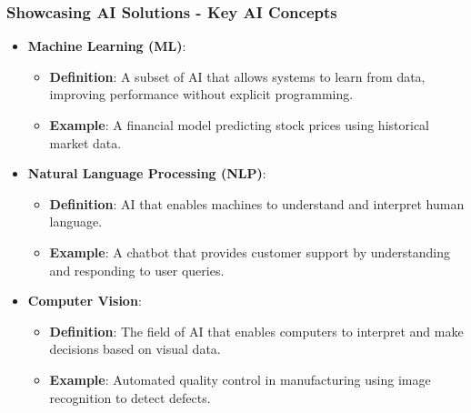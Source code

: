 \documentclass{beamer}
\begin{document}
\begin{frame}[fragile]
    \frametitle{Showcasing AI Solutions - Key AI Concepts}
    \begin{itemize}
        \item \textbf{Machine Learning (ML)}:
        \begin{itemize}
            \item \textbf{Definition}: A subset of AI that allows systems to learn from data, improving performance without explicit programming.
            \item \textbf{Example}: A financial model predicting stock prices using historical market data.
        \end{itemize}
        
        \item \textbf{Natural Language Processing (NLP)}:
        \begin{itemize}
            \item \textbf{Definition}: AI that enables machines to understand and interpret human language.
            \item \textbf{Example}: A chatbot that provides customer support by understanding and responding to user queries.
        \end{itemize}
        
        \item \textbf{Computer Vision}:
        \begin{itemize}
            \item \textbf{Definition}: The field of AI that enables computers to interpret and make decisions based on visual data.
            \item \textbf{Example}: Automated quality control in manufacturing using image recognition to detect defects.
        \end{itemize}
    \end{itemize}
\end{frame}
\end{document}
